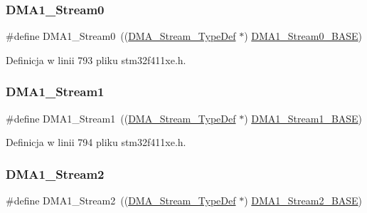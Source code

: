 \subsubsection{\texorpdfstring{D\+M\+A1\+\_\+\+Stream0}{DMA1\_Stream0}}
{\footnotesize\ttfamily \#define D\+M\+A1\+\_\+\+Stream0~((\hyperlink{struct_d_m_a___stream___type_def}{D\+M\+A\+\_\+\+Stream\+\_\+\+Type\+Def} $\ast$) \hyperlink{group___peripheral__memory__map_ga0d3c52aa35dcc68f78b704dfde57ba95}{D\+M\+A1\+\_\+\+Stream0\+\_\+\+B\+A\+SE})}



Definicja w linii 793 pliku stm32f411xe.\+h.

\mbox{\label{group___peripheral__declaration_gaf7d82f110f19982d483eebc465d222b2}} 
\subsubsection{\texorpdfstring{D\+M\+A1\+\_\+\+Stream1}{DMA1\_Stream1}}
{\footnotesize\ttfamily \#define D\+M\+A1\+\_\+\+Stream1~((\hyperlink{struct_d_m_a___stream___type_def}{D\+M\+A\+\_\+\+Stream\+\_\+\+Type\+Def} $\ast$) \hyperlink{group___peripheral__memory__map_ga5b4152cef577e37eccc9311d8bdbf3c2}{D\+M\+A1\+\_\+\+Stream1\+\_\+\+B\+A\+SE})}



Definicja w linii 794 pliku stm32f411xe.\+h.

\mbox{\label{group___peripheral__declaration_gad0e2140b8eeec3594035f1a7bf2a7250}} 
\subsubsection{\texorpdfstring{D\+M\+A1\+\_\+\+Stream2}{DMA1\_Stream2}}
{\footnotesize\ttfamily \#define D\+M\+A1\+\_\+\+Stream2~((\hyperlink{struct_d_m_a___stream___type_def}{D\+M\+A\+\_\+\+Stream\+\_\+\+Type\+Def} $\ast$) \hyperlink{group___peripheral__memory__map_ga48a551ee91d3f07dd74347fdb35c703d}{D\+M\+A1\+\_\+\+Stream2\+\_\+\+B\+A\+SE})}



